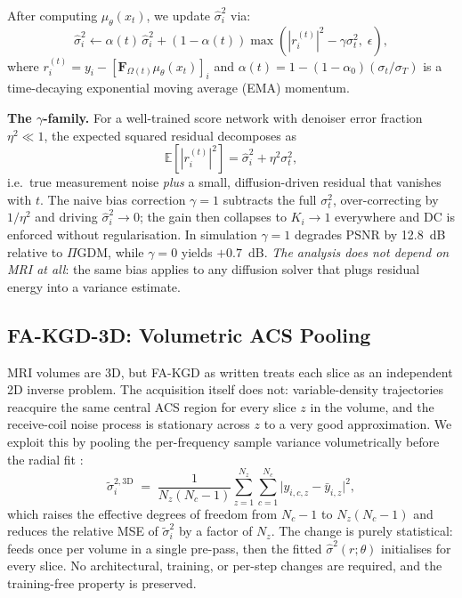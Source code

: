 \documentclass[conference]{IEEEtran}
\newcommand{\hatsig}{\hat{\sigma}}
\newcommand{\muth}{\mu_\theta}
\begin{document}
After computing $\muth(x_t)$, we update $\hatsig_i^2$ via:
\begin{equation}
  \hatsig_i^2 \leftarrow \alpha(t)\,\hatsig_i^2 + (1-\alpha(t))
  \max\!\left(|r_i^{(t)}|^2 - \gamma\sigma_t^2,\; \epsilon\right),
  \label{eq:mstep}
\end{equation}
where $r_i^{(t)} = y_i - [\mathbf{F}_{\Omega(t)}\muth(x_t)]_i$ and
$\alpha(t) = 1 - (1-\alpha_0)(\sigma_t / \sigma_T)$ is a time-decaying
exponential moving average (EMA) momentum.

\textbf{The $\gamma$-family.} For a well-trained score network with denoiser
error fraction $\eta^2\!\ll\!1$, the expected squared residual decomposes as
\begin{equation}
  \mathbb{E}\!\left[|r_i^{(t)}|^2\right] = \hatsig_i^2 + \eta^2\sigma_t^2 ,
  \label{eq:gamma_decomp}
\end{equation}
i.e.\ true measurement noise \emph{plus} a small, diffusion-driven residual
that vanishes with $t$. The naive bias correction $\gamma{=}1$ subtracts the
full $\sigma_t^2$, over-correcting by $1/\eta^2$ and driving
$\hatsig_i^2\!\to\!0$; the gain then collapses to $K_i\!\to\!1$ everywhere
and DC is enforced without regularisation. In simulation $\gamma{=}1$
degrades PSNR by 12.8~dB relative to $\Pi$GDM, while $\gamma{=}0$ yields
$+0.7$~dB. \emph{The analysis does not depend on MRI at all}: the same
bias applies to any diffusion solver that plugs residual energy into a
variance estimate.

\subsection{FA-KGD-3D: Volumetric ACS Pooling}
\label{sec:fakgd3d}

MRI volumes are 3D, but FA-KGD as written treats each slice as an
independent 2D inverse problem. The acquisition itself does not: variable-density
trajectories reacquire the same central ACS region for every slice $z$ in the
volume, and the receive-coil noise process is stationary across $z$ to a
very good approximation. We exploit this by pooling the per-frequency
sample variance volumetrically before the radial fit :
\begin{equation}
  \tilde\sigma_i^{2,\text{3D}} \;=\; \frac{1}{N_z(N_c-1)}
  \sum_{z=1}^{N_z}\sum_{c=1}^{N_c}
  \bigl|y_{i,c,z} - \bar y_{i,z}\bigr|^2,
  \label{eq:acs3d}
\end{equation}
which raises the effective degrees of freedom from $N_c{-}1$ to
$N_z(N_c{-}1)$ and reduces the relative MSE of $\tilde\sigma_i^2$ by a
factor of $N_z$. The change is purely statistical:  feeds
 once per volume in a single pre-pass, then the
fitted $\hatsig^2(r;\theta)$ initialises  for every slice.
No architectural, training, or per-step changes are required, and the
training-free property is preserved.
\end{document}
